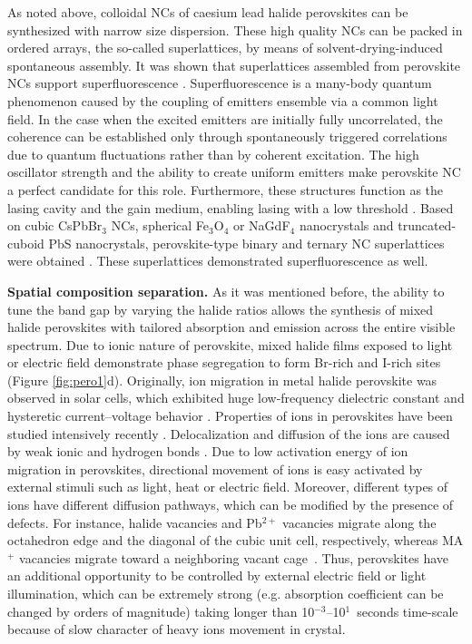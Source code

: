 \documentclass[journal=chreay,manuscript=review]{achemso}
\begin{document}
As noted above, colloidal NCs of caesium lead halide perovskites can be synthesized with narrow size dispersion. These high quality NCs can be packed in ordered arrays, the so-called superlattices, by means of solvent-drying-induced spontaneous assembly\cite{boles2016self, geuchies2016situ}. It was shown that superlattices assembled from perovskite NCs support superfluorescence \cite{raino2018superfluorescence}. Superfluorescence is a many-body quantum phenomenon caused by the coupling of emitters ensemble via a common light field. In the case when the excited emitters are initially fully uncorrelated, the coherence can be established only through spontaneously triggered correlations due to quantum fluctuations rather than by coherent excitation. The high oscillator strength and the ability to create uniform emitters make perovskite NC a perfect candidate for this role. Furthermore, these structures function as the lasing cavity and the gain medium, enabling lasing with a low threshold \cite{zhou2021quantum}. Based on cubic CsPbBr$_3$ NCs, spherical Fe$_3$O$_4$ or NaGdF$_4$ nanocrystals and truncated-cuboid PbS nanocrystals, perovskite-type binary and ternary NC superlattices were obtained \cite{cherniukh2021perovskite}. These superlattices demonstrated  superfluorescence as well. %


\textbf{Spatial composition separation.}
As it was mentioned before, the ability to tune the band gap by varying the halide ratios allows the synthesis of mixed halide perovskites with tailored absorption and emission across the entire visible spectrum. Due to ionic nature of perovskite, mixed halide films exposed to light or electric field demonstrate phase segregation to form Br-rich and I-rich sites (Figure \ref{fig:pero1}d). Originally, ion migration in metal halide perovskite was observed in solar cells, which exhibited huge low-frequency dielectric constant\cite{juarez2014photoinduced} and hysteretic current–voltage behavior \cite{jeon2014solvent}. Properties of ions in perovskites have been studied intensively recently \cite{yang2015significance}. Delocalization and diffusion of the ions are caused by weak ionic and hydrogen bonds \cite{wang2019stabilizing}. Due to low activation energy of ion migration in perovskites, directional movement of ions is easy activated by external stimuli such as light, heat or electric field. Moreover, different types of ions have different diffusion pathways, which can be modified by the presence of defects. For instance, halide vacancies and Pb$^{2+}$ vacancies migrate along the octahedron edge and the diagonal of the cubic unit cell, respectively, whereas MA$^+$ vacancies migrate toward a neighboring vacant cage~\cite{eames2015ionic}. Thus, perovskites have an additional opportunity to be controlled by external electric field or light illumination, which can be extremely strong (e.g. absorption coefficient can be changed by orders of magnitude) taking longer than 10$^{-3}$--10$^1$~seconds time-scale because of slow character of heavy ions movement in crystal.
\end{document}
